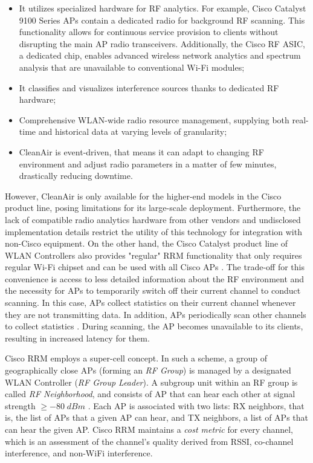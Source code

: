 \begin{itemize}
    \item It utilizes specialized hardware for RF analytics. For example, Cisco Catalyst 9100 Series APs contain a dedicated radio for background RF scanning. This functionality allows for continuous service provision to clients without disrupting the main AP radio transceivers. Additionally, the Cisco RF ASIC, a dedicated chip, enables advanced wireless network analytics and spectrum analysis that are unavailable to conventional Wi-Fi modules;
    \item It classifies and visualizes interference sources thanks to dedicated RF hardware;
    \item Comprehensive WLAN-wide radio resource management, supplying both real-time and historical data at varying levels of granularity;
    \item CleanAir is event-driven, that means it can adapt to changing RF environment and adjust radio parameters in a matter of few minutes, drastically reducing downtime.
\end{itemize}
However, CleanAir is only available for the higher-end models in the Cisco product line, posing limitations for its large-scale deployment. Furthermore, the lack of compatible radio analytics hardware from other vendors and undisclosed implementation details restrict the utility of this technology for integration with non-Cisco equipment.
On the other hand, the Cisco Catalyst product line of WLAN Controllers also provides "regular" RRM functionality that only requires regular Wi-Fi chipset and can be used with all Cisco APs \cite{ciscoRadioResourceManagement}. The trade-off for this convenience is access to less detailed information about the RF environment and the necessity for APs to temporarily switch off their current channel to conduct scanning. In this case, APs collect statistics on their current channel whenever they are not transmitting data. In addition, APs periodically scan other channels to collect statistics \cite{arenaUnderstandingTroubleshootingCisco2022}. During scanning, the AP becomes unavailable to its clients, resulting in increased latency for them.

Cisco RRM employs a super-cell concept. In such a scheme, a group of geographically close APs (forming an \textit{RF Group}) is managed by a designated WLAN Controller (\textit{RF Group Leader}).
A subgroup unit within an RF group is called \textit{RF Neighborhood}, and consists of AP that can hear each other at signal strength $\geq -80 \; dBm$ \cite{arenaUnderstandingTroubleshootingCisco2022}. Each AP is associated with two lists: RX neighbors, that is, the list of APs that a given AP can hear, and TX neighbors, a list of APs that can hear the given AP. Cisco RRM maintains a \textit{ cost metric} for every channel, which is an assessment of the channel's quality derived from RSSI, co-channel interference, and non-WiFi interference.


